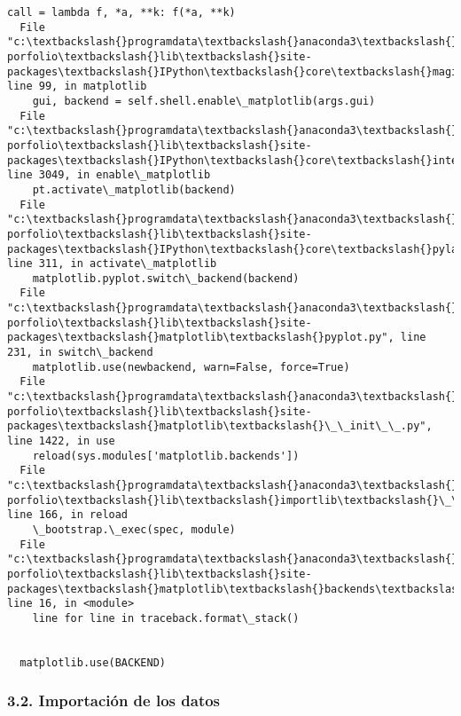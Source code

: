 \documentclass[11pt]{article}
\begin{document}
\begin{Verbatim}[commandchars=\\\{\}]
    call = lambda f, *a, **k: f(*a, **k)
  File "c:\textbackslash{}programdata\textbackslash{}anaconda3\textbackslash{}envs\textbackslash{}ml-porfolio\textbackslash{}lib\textbackslash{}site-packages\textbackslash{}IPython\textbackslash{}core\textbackslash{}magics\textbackslash{}pylab.py", line 99, in matplotlib
    gui, backend = self.shell.enable\_matplotlib(args.gui)
  File "c:\textbackslash{}programdata\textbackslash{}anaconda3\textbackslash{}envs\textbackslash{}ml-porfolio\textbackslash{}lib\textbackslash{}site-packages\textbackslash{}IPython\textbackslash{}core\textbackslash{}interactiveshell.py", line 3049, in enable\_matplotlib
    pt.activate\_matplotlib(backend)
  File "c:\textbackslash{}programdata\textbackslash{}anaconda3\textbackslash{}envs\textbackslash{}ml-porfolio\textbackslash{}lib\textbackslash{}site-packages\textbackslash{}IPython\textbackslash{}core\textbackslash{}pylabtools.py", line 311, in activate\_matplotlib
    matplotlib.pyplot.switch\_backend(backend)
  File "c:\textbackslash{}programdata\textbackslash{}anaconda3\textbackslash{}envs\textbackslash{}ml-porfolio\textbackslash{}lib\textbackslash{}site-packages\textbackslash{}matplotlib\textbackslash{}pyplot.py", line 231, in switch\_backend
    matplotlib.use(newbackend, warn=False, force=True)
  File "c:\textbackslash{}programdata\textbackslash{}anaconda3\textbackslash{}envs\textbackslash{}ml-porfolio\textbackslash{}lib\textbackslash{}site-packages\textbackslash{}matplotlib\textbackslash{}\_\_init\_\_.py", line 1422, in use
    reload(sys.modules['matplotlib.backends'])
  File "c:\textbackslash{}programdata\textbackslash{}anaconda3\textbackslash{}envs\textbackslash{}ml-porfolio\textbackslash{}lib\textbackslash{}importlib\textbackslash{}\_\_init\_\_.py", line 166, in reload
    \_bootstrap.\_exec(spec, module)
  File "c:\textbackslash{}programdata\textbackslash{}anaconda3\textbackslash{}envs\textbackslash{}ml-porfolio\textbackslash{}lib\textbackslash{}site-packages\textbackslash{}matplotlib\textbackslash{}backends\textbackslash{}\_\_init\_\_.py", line 16, in <module>
    line for line in traceback.format\_stack()


  matplotlib.use(BACKEND)

    \end{Verbatim}

    \subsubsection{3.2. Importación de los datos
}\label{importaciuxf3n-de-los-datos}
\end{document}
